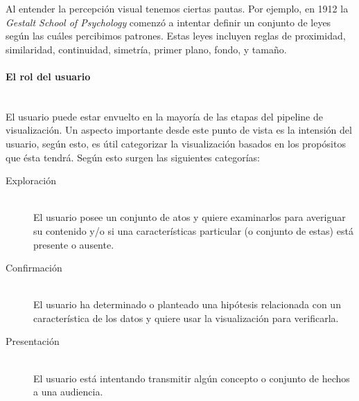 \documentclass[12pt]{article}
\begin{document}
Al entender la percepción visual tenemos ciertas pautas. Por ejemplo, en 1912 la \textit{Gestalt School of Psychology} comenzó a intentar definir un conjunto de leyes según las cuáles percibimos patrones. Estas leyes incluyen reglas de proximidad, similaridad, continuidad, simetría, primer plano, fondo, y tamaño.


\paragraph{El rol del usuario} \hfill \\

El usuario puede estar envuelto en la mayoría de las etapas del pipeline de visualización. Un aspecto importante desde este punto de vista es la intensión del usuario, según esto, es útil categorizar la visualización basados en los propósitos que ésta tendrá. Según esto surgen las siguientes categorías:

\begin{description}
	\item[Exploración] \hfill \\
El usuario posee un conjunto de atos y quiere examinarlos para averiguar su contenido y/o si una características particular (o conjunto de estas)  está presente o ausente.

	\item[Confirmación] \hfill \\
El usuario ha determinado o planteado una hipótesis relacionada con un característica de los datos y quiere usar la visualización para verificarla.

	\item[Presentación] \hfill \\
El usuario está intentando transmitir algún concepto o conjunto de hechos a una audiencia.
\end{description}


    
\end{document}
